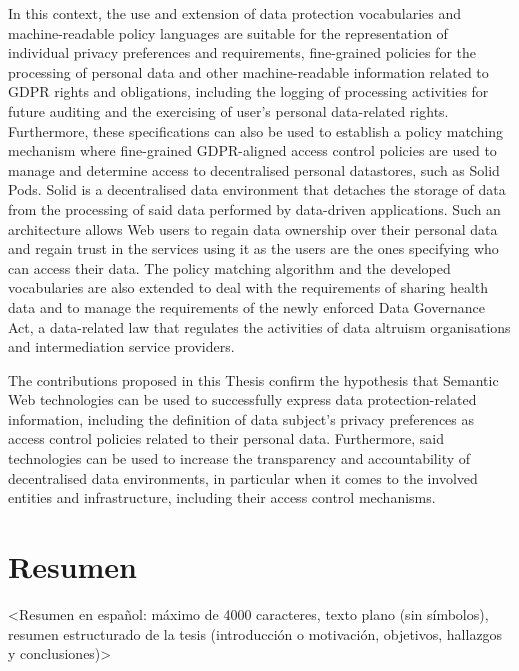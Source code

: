 In this context, the use and extension of data protection vocabularies and machine-readable policy languages are suitable for the representation of individual privacy preferences and requirements, fine-grained policies for the processing of personal data and other machine-readable information related to GDPR rights and obligations, including the logging of processing activities for future auditing and the exercising of user's personal data-related rights.
Furthermore, these specifications can also be used to establish a policy matching mechanism where fine-grained GDPR-aligned access control policies are used to manage and determine access to decentralised personal datastores, such as Solid Pods.
Solid is a decentralised data environment that detaches the storage of data from the processing of said data performed by data-driven applications.
Such an architecture allows Web users to regain data ownership over their personal data and regain trust in the services using it as the users are the ones specifying who can access their data.
The policy matching algorithm and the developed vocabularies are also extended to deal with the requirements of sharing health data and to manage the requirements of the newly enforced Data Governance Act, a data-related law that regulates the activities of data altruism organisations and intermediation service providers.

The contributions proposed in this Thesis confirm the hypothesis that Semantic Web technologies can be used to successfully express data protection-related information, including the definition of data subject's privacy preferences as access control policies related to their personal data.
Furthermore, said technologies can be used to increase the transparency and accountability of decentralised data environments, in particular when it comes to the involved entities and infrastructure, including their access control mechanisms.

\newpage
\section*{Resumen}
\label{sec::resumen}


<Resumen en español: máximo de 4000 caracteres, texto plano (sin símbolos), resumen estructurado de la tesis (introducción o motivación, objetivos, hallazgos y conclusiones)>

